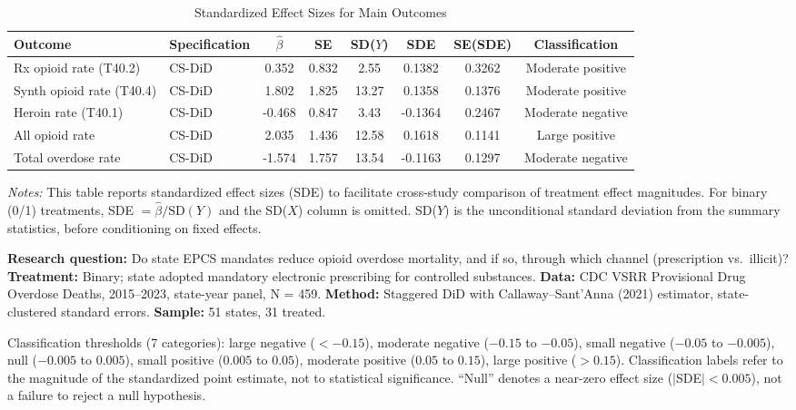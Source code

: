 \begin{table}[H]
\centering
\caption{Standardized Effect Sizes for Main Outcomes}
\label{tab:sde}
\begin{adjustbox}{max width=\textwidth}
\begin{tabular}{llcccccc}
\toprule
Outcome & Specification & $\hat{\beta}$ & SE & SD($Y$) & SDE & SE(SDE) & Classification \\
\midrule
Rx opioid rate (T40.2) & CS-DiD & 0.352 & 0.832 & 2.55 & 0.1382 & 0.3262 & Moderate positive \\
Synth opioid rate (T40.4) & CS-DiD & 1.802 & 1.825 & 13.27 & 0.1358 & 0.1376 & Moderate positive \\
Heroin rate (T40.1) & CS-DiD & -0.468 & 0.847 & 3.43 & -0.1364 & 0.2467 & Moderate negative \\
All opioid rate & CS-DiD & 2.035 & 1.436 & 12.58 & 0.1618 & 0.1141 & Large positive \\
Total overdose rate & CS-DiD & -1.574 & 1.757 & 13.54 & -0.1163 & 0.1297 & Moderate negative \\
\bottomrule
\end{tabular}
\end{adjustbox}
\par\vspace{0.3em}
{\footnotesize \emph{Notes:} This table reports standardized effect sizes (SDE) to facilitate cross-study comparison of treatment effect magnitudes. For binary (0/1) treatments, SDE $= \hat{\beta} / \text{SD}(Y)$ and the SD($X$) column is omitted. SD($Y$) is the unconditional standard deviation from the summary statistics, before conditioning on fixed effects.

\textbf{Research question:} Do state EPCS mandates reduce opioid overdose mortality, and if so, through which channel (prescription vs.\ illicit)?
\textbf{Treatment:} Binary; state adopted mandatory electronic prescribing for controlled substances.
\textbf{Data:} CDC VSRR Provisional Drug Overdose Deaths, 2015--2023, state-year panel, N = 459.
\textbf{Method:} Staggered DiD with Callaway--Sant'Anna (2021) estimator, state-clustered standard errors.
\textbf{Sample:} 51 states, 31 treated.

Classification thresholds (7 categories): large negative ($< -0.15$), moderate negative ($-0.15$ to $-0.05$), small negative ($-0.05$ to $-0.005$), null ($-0.005$ to $0.005$), small positive ($0.005$ to $0.05$), moderate positive ($0.05$ to $0.15$), large positive ($> 0.15$). Classification labels refer to the magnitude of the standardized point estimate, not to statistical significance. ``Null'' denotes a near-zero effect size ($|$SDE$| < 0.005$), not a failure to reject a null hypothesis.}
\end{table}
